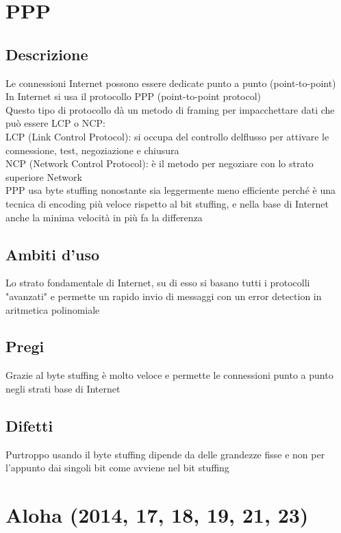 \documentclass[10pt,oneside,a4paper]{article}
\begin{document}
\section{PPP}
\subsection{Descrizione}
Le connessioni Internet possono essere dedicate punto a punto (point-to-point)\\
In Internet si usa il protocollo PPP (point-to-point protocol)\\
Questo tipo di protocollo dà un metodo di framing per impacchettare dati che può essere LCP o NCP:\\
LCP (Link Control Protocol): si occupa del controllo delflusso per attivare le connessione, test, negoziazione e chiusura\\
NCP (Network Control Protocol): è il metodo per negoziare con lo strato superiore Network\\
PPP usa byte stuffing nonostante sia leggermente meno efficiente perché è una tecnica di encoding più veloce rispetto al bit stuffing, e nella base di Internet anche la minima velocità in più fa la differenza
\subsection{Ambiti d'uso}
Lo strato fondamentale di Internet, su di esso si basano tutti i protocolli "avanzati" e permette un rapido invio di messaggi con un error detection in aritmetica polinomiale
\subsection{Pregi}
Grazie al byte stuffing è molto veloce e permette le connessioni punto a punto negli strati base di Internet
\subsection{Difetti}
Purtroppo usando il byte stuffing dipende da delle grandezze fisse e non per l'appunto dai singoli bit come avviene nel bit stuffing
\section{Aloha (2014, 17, 18, 19, 21, 23)}
\end{document}
